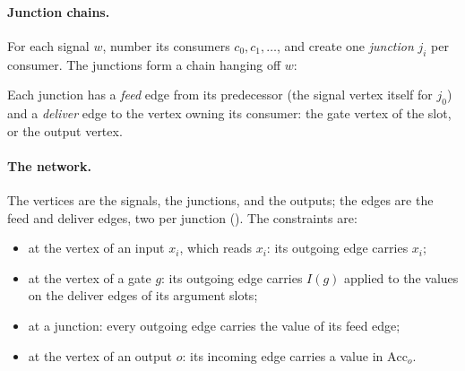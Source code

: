 \documentclass[11pt]{article}
\theoremstyle{plain}
\theoremstyle{definition}
\theoremstyle{remark}
\newcommand{\Acc}{\mathrm{Acc}}
\begin{document}
\paragraph{Junction chains.} For each signal $w$, number its consumers $c_0, c_1, \dots$, and
create one \emph{junction} $j_i$ per consumer. The junctions form a chain hanging off $w$:
\begin{center}
\end{center}
Each junction has a \emph{feed} edge from its predecessor (the signal vertex itself for $j_0$)
and a \emph{deliver} edge to the vertex owning its consumer: the gate vertex of the slot, or
the output vertex.

\paragraph{The network.} The vertices are the signals, the junctions, and the outputs; the edges
are the feed and deliver edges, two per junction (). The
constraints are:
\begin{itemize}
\item at the vertex of an input $x_i$, which reads $x_i$: its outgoing edge carries $x_i$;
\item at the vertex of a gate $g$: its outgoing edge carries $I(g)$ applied to the values on the
  deliver edges of its argument slots;
\item at a junction: every outgoing edge carries the value of its feed edge;
\item at the vertex of an output $o$: its incoming edge carries a value in $\Acc_o$.
\end{itemize}
\end{document}
